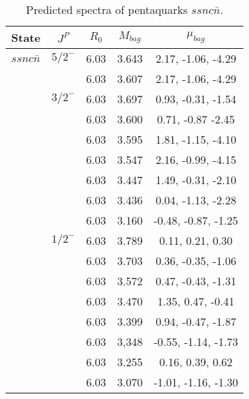 \documentclass[prd,twocolumn,floatfix,nofootinbib]{revtex4}
\begin{document}
\renewcommand{\tabcolsep}{0.5cm}
\renewcommand{\arraystretch}{1.2}
\begin{table*}[!htbp]
    \caption{Predicted spectra of pentaquarks $ssnc\bar{n}$.}
    \begin{tabular}{ccccc}
        \hline\hline
        {\rm State} &$J^{P}$ &$R_{0}$ &$M_{bag}$ &$\mu_{bag}$ \\ \hline
        $ssnc\bar{n}$
            &${5/2}^{-}$    &6.03   &3.643  &2.17, -1.06, -4.29 \\
            &               &6.03   &3.607  &2.17, -1.06, -4.29 \\
            &${3/2}^{-}$    &6.03   &3.697  &0.93, -0.31, -1.54 \\
            &               &6.03   &3.600  &0.71, -0.87 -2.45 \\
            &               &6.03   &3.595  &1.81, -1.15, -4.10 \\
            &               &6.03   &3.547  &2.16, -0.99, -4.15 \\
            &               &6.03   &3.447  &1.49, -0.31, -2.10 \\
            &               &6.03   &3.436  &0.04, -1.13, -2.28 \\
            &               &6.03   &3.160  &-0.48, -0.87, -1.25 \\
            &${1/2}^{-}$    &6.03   &3.789  &0.11, 0.21, 0.30 \\
            &               &6.03   &3.703  &0.36, -0.35, -1.06 \\
            &               &6.03   &3.572  &0.47, -0.43, -1.31 \\
            &               &6.03   &3.470  &1.35, 0.47, -0.41 \\
            &               &6.03   &3.399  &0.94, -0.47, -1.87 \\
            &               &6.03   &3,348  &-0.55, -1.14, -1.73 \\
            &               &6.03   &3.255  &0.16, 0.39, 0.62 \\
            &               &6.03   &3.070  &-1.01, -1.16, -1.30 \\
        \hline\hline
    \end{tabular}
\end{table*}
\end{document}
